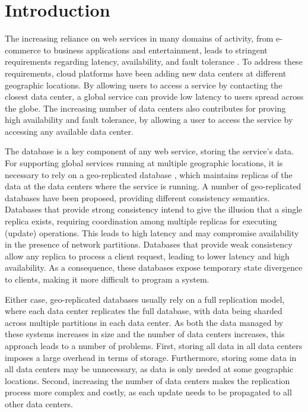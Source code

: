 \documentclass{vldb}
\begin{document}
\section{Introduction}
\label{sec:introduction}


The increasing reliance on web services in many domains of activity, from e-commerce to business applications
and entertainment, leads to stringent requirements regarding latency, availability,
and fault tolerance \cite{Schurman2009latency,gomez}.
To address these requirements, cloud platforms have been adding new data centers at different geographic 
locations. By allowing users to access a service by contacting the closest data center, a global service can
provide low latency to users spread across the globe. The increasing number of data centers also contributes
for proving high availability and fault tolerance, by allowing a user to access the service by accessing any
available data center.


The database is a key component of any web service, storing the service's data. For supporting global
services running at multiple geographic locations, it is necessary to rely on a geo-replicated database \cite{dynamo},
which maintains replicas of the data at the data centers where the service is running.
A number of geo-replicated databases have been proposed, providing different consistency semantics.
Databases that provide strong consistency \cite{spanner,cockroachdb,mdcc} intend to give  the illusion that 
a single replica exists, requiring coordination among
multiple replicas for executing (update) operations. This leads to high latency and may compromise 
availability in the presence of network partitions.
Databases that provide weak consistency \cite{eventual,dynamo,cops} allow any replica to process a
client request, leading to lower latency and high availability. As a consequence, these databases expose
temporary state divergence to clients, making it more difficult to program a system. 

Either case, geo-replicated databases usually rely on a full replication model, where each data 
center replicates the full database, with data being sharded across multiple partitions in each data 
center. 
As both the data managed by these systems increases in size and the number of data centers increases,
this approach leads to a number of problems.
First, storing all data in all data centers imposes a large overhead in terms of storage. 
Furthermore, storing some data in all data centers may be unnecessary, as data is only needed at some
geographic locations.
Second, increasing the number of data centers makes the replication process more complex and costly, 
as each update needs to be propagated to all other data centers.
\end{document}
